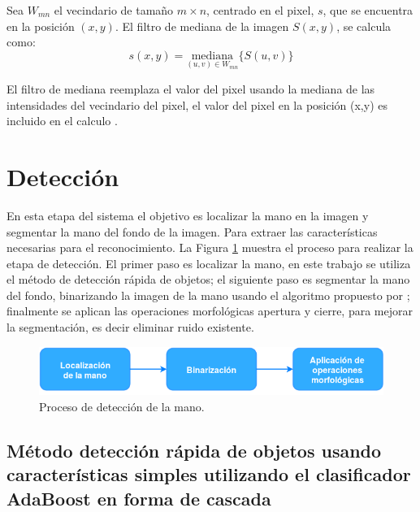 Sea $W_{mn}$ el vecindario de tamaño $m \times n$, centrado en el pixel, $s$, que se encuentra en la posición $(x,y)$. El filtro de mediana de la imagen $S(x,y)$, se calcula como: 
\begin{equation}
s(x,y)=\underset{(u,v)\in W_{mn}}{\text{mediana}} \lbrace S(u,v)\rbrace
\end{equation}

El filtro de mediana reemplaza el valor del pixel usando la mediana de las intensidades del vecindario del pixel, el valor del pixel en la posición (x,y) es incluido en el calculo \citep{Gonzalez2002}. 
 



\section{Detección}\label{sec:Detection}

En esta etapa del sistema el objetivo es localizar la mano en la imagen y segmentar la mano del fondo de la imagen. Para extraer las características necesarias para el reconocimiento.
La Figura \ref{fig:ProcesoDeteccion} muestra el proceso para  realizar la etapa de detección. El primer paso es localizar la mano, en este trabajo se utiliza el método de detección rápida de objetos; el siguiente paso es segmentar la mano del fondo, binarizando la imagen de la mano usando el algoritmo propuesto por \citep{Otsu1979}; finalmente se aplican las operaciones morfológicas apertura y cierre, para mejorar la segmentación, es decir eliminar ruido existente. 

\begin{figure}[h!]
\begin{center}
\includegraphics[scale=.7]{./Figures/Detection.png}
\end{center}
\caption{Proceso de detección de la mano.}
\label{fig:ProcesoDeteccion}
\end{figure} 

\subsection{Método detección rápida de objetos usando características simples utilizando el clasificador AdaBoost en forma de cascada}\label{subsec:ViolaJones}

